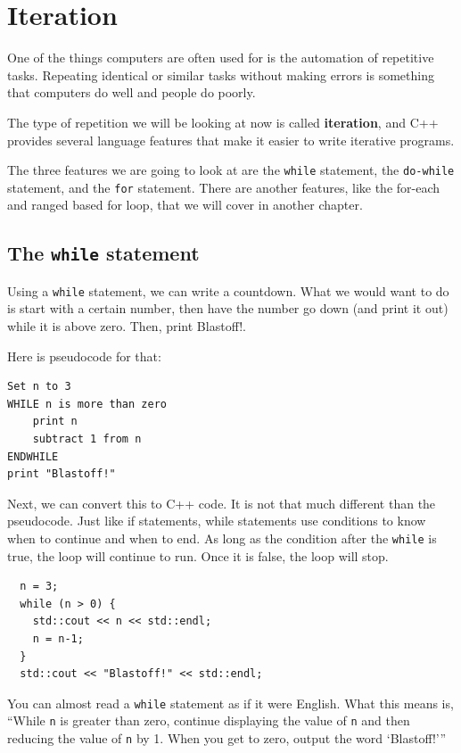 
\chapter{Iteration}

One of the things computers are often used for is the automation
of repetitive tasks.  Repeating identical or similar tasks without
making errors is something that computers do well and people do
poorly.

The
type of repetition we will be looking at now is called {\bf iteration}, and C++ provides
several language features that make it easier to write iterative
programs.

The three features we are going to look at are the {\tt while}
statement, the {\tt do-while} statement, and the {\tt for} statement. There are another features, like the for-each and ranged based for loop, that we will cover in another chapter.

\section{The {\tt while} statement}

Using a {\tt while} statement, we can write a countdown. What we would want to do is start with a certain number, then have the number go down (and print it out) while it is above zero. Then, print Blastoff!.

Here is pseudocode for that:
\begin{verbatim}
Set n to 3
WHILE n is more than zero
    print n
    subtract 1 from n
ENDWHILE
print "Blastoff!"
\end{verbatim}

Next, we can convert this to C++ code. It is not that much different than the pseudocode. Just like if statements, while statements use conditions to know when to continue and when to end. As long as the condition after the {\tt while} is true, the loop will continue to run. Once it is false, the loop will stop.

\begin{lstlisting}
  n = 3;
  while (n > 0) {
    std::cout << n << std::endl;
    n = n-1;
  }
  std::cout << "Blastoff!" << std::endl;
\end{lstlisting}
%
You can almost read a {\tt while} statement as if it were
English.  What this means is, ``While {\tt n} is greater than
zero, continue displaying the value of {\tt n} and then reducing
the value of {\tt n} by 1.  When you get to zero, output the
word `Blastoff!'''

